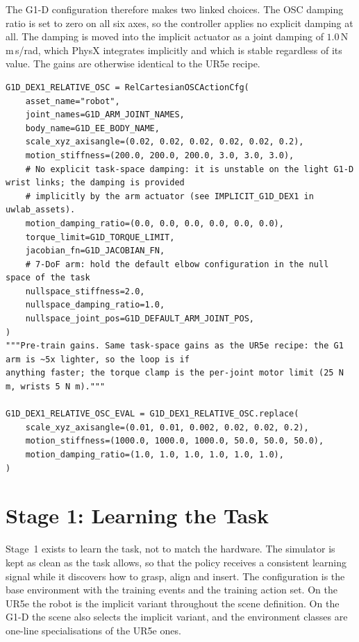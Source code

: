 The G1-D configuration therefore makes two linked choices. The OSC damping ratio is set to zero on all six axes, so the controller applies no explicit damping at all. The damping is moved into the implicit actuator as a joint damping of $1.0$\,N\,m\,s/rad, which PhysX integrates implicitly and which is stable regardless of its value. The gains are otherwise identical to the UR5e recipe.

\begin{snippetbox}[11]
\begin{lstlisting}[firstnumber=27]
G1D_DEX1_RELATIVE_OSC = RelCartesianOSCActionCfg(
    asset_name="robot",
    joint_names=G1D_ARM_JOINT_NAMES,
    body_name=G1D_EE_BODY_NAME,
    scale_xyz_axisangle=(0.02, 0.02, 0.02, 0.02, 0.02, 0.2),
    motion_stiffness=(200.0, 200.0, 200.0, 3.0, 3.0, 3.0),
    # No explicit task-space damping: it is unstable on the light G1-D wrist links; the damping is provided
    # implicitly by the arm actuator (see IMPLICIT_G1D_DEX1 in uwlab_assets).
    motion_damping_ratio=(0.0, 0.0, 0.0, 0.0, 0.0, 0.0),
    torque_limit=G1D_TORQUE_LIMIT,
    jacobian_fn=G1D_JACOBIAN_FN,
    # 7-DoF arm: hold the default elbow configuration in the null space of the task
    nullspace_stiffness=2.0,
    nullspace_damping_ratio=1.0,
    nullspace_joint_pos=G1D_DEFAULT_ARM_JOINT_POS,
)
"""Pre-train gains. Same task-space gains as the UR5e recipe: the G1 arm is ~5x lighter, so the loop is if
anything faster; the torque clamp is the per-joint motor limit (25 N m, wrists 5 N m)."""

G1D_DEX1_RELATIVE_OSC_EVAL = G1D_DEX1_RELATIVE_OSC.replace(
    scale_xyz_axisangle=(0.01, 0.01, 0.002, 0.02, 0.02, 0.2),
    motion_stiffness=(1000.0, 1000.0, 1000.0, 50.0, 50.0, 50.0),
    motion_damping_ratio=(1.0, 1.0, 1.0, 1.0, 1.0, 1.0),
)
\end{lstlisting}
\end{snippetbox}

\section{Stage 1: Learning the Task}
\label{sec:stage1}

Stage~1 exists to learn the task, not to match the hardware. The simulator is kept as clean as the task allows, so that the policy receives a consistent learning signal while it discovers how to grasp, align and insert. The configuration is the base environment with the training events and the training action set. On the UR5e the robot is the implicit variant throughout the scene definition. On the G1-D the scene also selects the implicit variant, and the environment classes are one-line specialisations of the UR5e ones.

